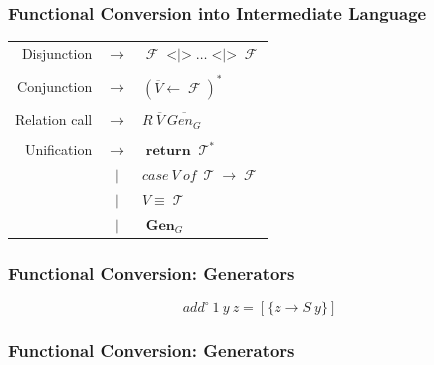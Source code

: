 \documentclass[xcolor=table, aspectratio=169]{beamer}
\DeclareMathOperator{\Term}{\mathcal{T}}
\DeclareMathOperator{\Fun}{\mathcal{F}}
\DeclareMathOperator{\Rtrn}{\mathbf{return}}
\DeclareMathOperator{\Sum}{\mathbf{<|>}}
\DeclareMathOperator{\Gen}{\mathbf{Gen}}
\newcommand{\LIST}[1]{ #1^*}
\begin{document}
\begin{frame}[fragile]
  \frametitle{Functional Conversion into Intermediate Language}
\begin{center}
\begin{tabular}{rcl}
  Disjunction   & $\rightarrow$ & $\Fun \Sum \ldots \Sum \Fun$ \\ && \\
  Conjunction   & $\rightarrow$ & $ \LIST{\left(\overline{V} \leftarrow \Fun\right)}$ \\ && \\
  Relation call & $\rightarrow$ & $ R\ \overline{V}\ \overline{Gen_{G}}$ \\ && \\
  Unification   & $\rightarrow$ & $\Rtrn \LIST{\Term}$ \\
                & $|$           & $case\ V\ of\ \Term \to \Fun$ \\
                & $|$           & $V \equiv \Term$ \\
                & $|$           & $\Gen_{G}$
\end{tabular}
\end{center}
\end{frame}


\begin{frame}[fragile]
  \frametitle{Functional Conversion: Generators}





% 

\[ add^{\circ}\ 1\ y\ z = \left[\{z \to S\ y\} \right] \] 
\end{frame}

\begin{frame}[fragile]
  \frametitle{Functional Conversion: Generators}



% 

\end{frame}
\end{document}
